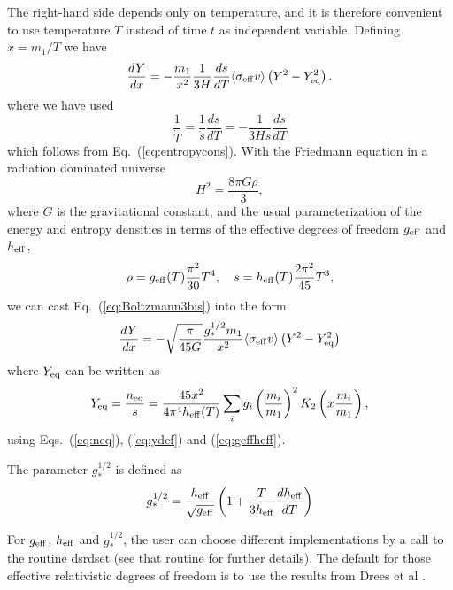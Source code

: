 \documentclass[a4paper,10pt,oneside]{book}
\newcommand{\code}[1]{\ft{#1}}
\newcommand{\ft}[1]{\textsf{#1}}
\begin{document}
The right-hand side depends only on temperature, and it is therefore
convenient to use temperature $T$ instead of time $t$ as independent
variable. Defining $x=m_1/T$ we have
\begin{equation}
  \frac{dY}{dx} = - \frac{m_{1}}{x^2} \frac{1}{3H} \frac{ds}{dT}
  \langle \sigma_{\rm{eff}} v \rangle \left( Y^2 -
  Y_{\rm{eq}}^2 \right).
\label{eq:Boltzmann3bis}
\end{equation}
where we have used
\begin{equation}
  \frac{1}{\dot{T}} = \frac{1}{\dot{s}} \frac{ds}{dT} = -
  \frac{1}{3Hs} \frac{ds}{dT} 
\end{equation} 
which follows from Eq.~(\ref{eq:entropycons}). 
With the Friedmann equation in a radiation dominated universe
\begin{equation}
  H^2 = \frac{8\pi G \rho}{3} ,
\end{equation}
where $G$ is the gravitational constant, and the
usual parameterization of the energy and entropy densities
in terms of the effective degrees of freedom $g_{\rm{eff}}$ and
$h_{\rm{eff}}$, \begin{equation} \label{eq:geffheff}
  \rho = g_{\rm{eff}}(T) \frac{\pi^2}{30} T^4
  , \quad 
  s = h_{\rm{eff}}(T) \frac{2\pi^2}{45} T^3 ,
\end{equation}
we can cast Eq.~(\ref{eq:Boltzmann3bis})
into the form \cite{Gondolo:1990dk}
\begin{equation} \label{eq:Boltzmann4}
  \frac{dY}{dx} = - \sqrt{\frac{\pi}{45G}} \frac{g_{*}^{1/2}m_1}{x^2}
  \langle \sigma_{\rm{eff}} v \rangle \left( Y^2 -
  Y_{\rm{eq}}^2 \right) 
\end{equation}
where $Y_{\rm eq}$ can be written as
\begin{equation}
  Y_{\rm{eq}} = \frac{n_{\rm{eq}}}{s} = 
  \frac{45 x^2}{4 \pi^4 h_{\rm{eff}}(T)} \sum_i g_i
  \left( \frac{m_i}{m_1} \right)^2 K_{2} \left( x 
\frac{m_{i}}{m_1}\right),
\end{equation}
using Eqs.~(\ref{eq:neq}), (\ref{eq:ydef}) and
(\ref{eq:geffheff}).

The parameter $g_{*}^{1/2}$ is defined as
\begin{equation}
  g_{*}^{1/2} = \frac{h_{\rm{eff}}}{\sqrt{g_{\rm{eff}}}}
  \left( 1+\frac{T}{3h_{\rm{eff}}} \frac{d h_{\rm{eff}}}{dT}
  \right)
\end{equation}

For $g_{\rm eff}$, $h_{\rm eff}$ and $g_*^{1/2}$, the user can choose different implementations by a call to 
the routine \code{dsrdset} (see that routine for further details). The default for those effective relativistic 
degrees of freedom is to use the results from Drees et al \cite{Drees:2015exa}.
\end{document}
